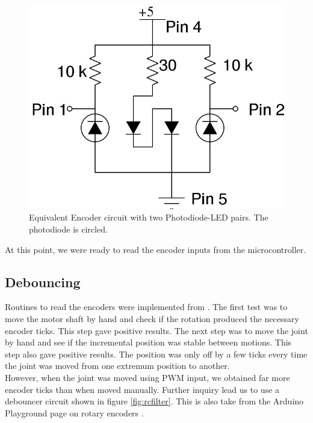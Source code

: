 \documentclass[10pt,a4paper]{article}
\begin{document}
\begin{figure}[H]
    \centering
    \includegraphics[scale=0.5]{EncoderCircuit.jpg}
    \caption{Equivalent Encoder circuit with two Photodiode-LED
      pairs. The photodiode is circled.}
    \label{fig:encoderCircuit}
\end{figure}

At this point, we were ready to read the encoder inputs from the
microcontroller. 

\subsection{Debouncing}

Routines to read the encoders were implemented from
\cite{ArduinoPlaygroundRE}.
The first test was to move the motor shaft by hand and check if the
rotation produced the necessary encoder ticks. This step gave positive
results. The next step was to move the joint by hand and see if the
incremental position was stable between motions. This step also gave
positive results. The position was only off by a few ticks every time
the joint was moved from one extremum position to another. \\

However, when the joint was moved using PWM input, we obtained far
more encoder ticks than when moved manually. Further inquiry lead us
to use a debouncer circuit shown in figure \ref{fig:rcfilter}. This is
also take from the Arduino Playground page on rotary encoders
\cite{ArduinoPlaygroundRE}.\\
\end{document}
